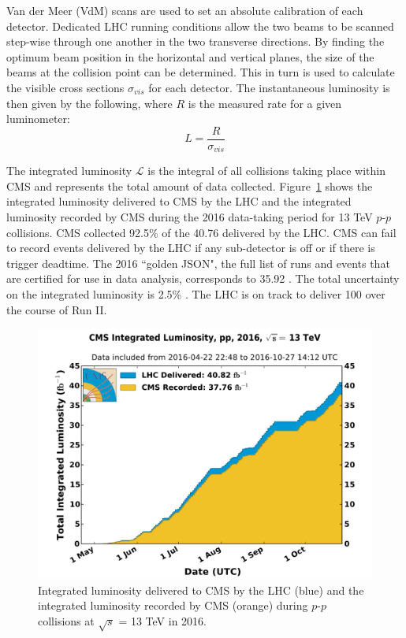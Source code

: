 Van der Meer (VdM) scans \cite{VanderMeer} are used to set an absolute calibration of each detector. Dedicated LHC running conditions allow the two beams to be scanned step-wise through one another in the two transverse directions. By finding the optimum beam position in the horizontal and vertical planes, the size of the beams at the collision point can be determined. This in turn is used to calculate the visible cross sections $\sigma_{vis}$ for each detector. The instantaneous luminosity is then given by the following, where $R$ is the measured rate for a given luminometer:
\begin{equation}
L = \frac{R}{\sigma_{vis}}
\end{equation}

The integrated luminosity $\mathcal{L}$ is the integral of all collisions taking place within CMS and represents the total amount of data collected. Figure~\ref{fig:lumi} shows the integrated luminosity delivered to CMS by the LHC and the integrated luminosity recorded by CMS during the 2016 data-taking period for 13 TeV $p$-$p$ collisions. CMS collected 92.5\% of the 40.76 \fbinv delivered by the LHC. CMS can fail to record events delivered by the LHC if any sub-detector is off or if there is trigger deadtime. The 2016 ``golden JSON", the full list of runs and events that are certified for use in data analysis, corresponds to 35.92 \fbinv. The total uncertainty on the integrated luminosity is 2.5\% \cite{lumiPAS}. The LHC is on track to deliver 100 \fbinv over the course of Run II. 

\begin{figure}[h!]
	\centering
	\includegraphics[width=\linewidth]{Figures/Detector/int_lumi_per_day_cumulative_pp_2016.pdf}
       \caption{Integrated luminosity delivered to CMS by the LHC (blue) and the integrated luminosity recorded by CMS (orange) during $p$-$p$ collisions at $\sqrt{s}$ = 13 TeV in 2016.}
         \label{fig:lumi}
\end{figure}






